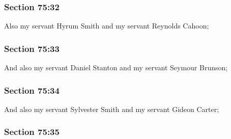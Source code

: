 	\subsubsection{Section 75:32} %
		\label{DC75-32}

		Also my servant Hyrum Smith and my servant Reynolds Cahoon;


	\subsubsection{Section 75:33} %
		\label{DC75-33}

		And also my servant Daniel Stanton and my servant Seymour Brunson;


	\subsubsection{Section 75:34} %
		\label{DC75-34}

		And also my servant Sylvester Smith and my servant Gideon Carter;


	\subsubsection{Section 75:35} %
		\label{DC75-35}

